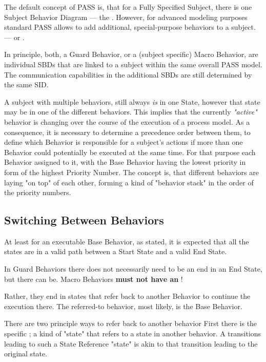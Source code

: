 The default concept of PASS is, that for a Fully Specified Subject, there is one Subject Behavior Diagram --- the . However, for advanced modeling purposes standard PASS allows to add additional, special-purpose behaviors to a subject.
---  or . 

In principle, both, a Guard Behavior, or a (subject specific) Macro Behavior, are individual SBDs that are linked to a subject within the same overall PASS model. The communication capabilities in the additional SBDs are still determined by the same SID. 

A subject with multiple behaviors, still always \textit{is} in one State, however that state may be in one of the different behaviors. This implies that the currently \textit{"active"} behavior is changing over the course of the execution of a process model. As a consequence, it is necessary to determine a precedence order between them, to define which Behavior is responsible for a subject's actions if more than one Behavior could potentially be executed at the same time. For that purpose each Behavior  assigned to it, with the Base Behavior having the lowest priority in form of the highest Priority Number. The concept is, that different behaviors are laying "on top" of each other, forming a kind of "behavior stack" in the order of the priority numbers. 

\subsection{Switching Between Behaviors}
\label{sec:stateRef}

At least for an executable Base Behavior, as stated, it is expected that all the  states  are in a valid path between a Start State and a valid End State.

In Guard Behaviors there does not necessarily need to be an end in an End State, but there can be. Macro Behaviors \textbf{must not have an} !

Rather, they end in states that refer back to another Behavior to continue the execution there. The referred-to behavior, most likely, is the Base Behavior. 

There are two principle ways to refer back to another behavior First there is the specific ; a kind of "state" that refers to a state in another behavior. A transitions leading to such a State Reference "state" is akin to that transition leading to the original state.


